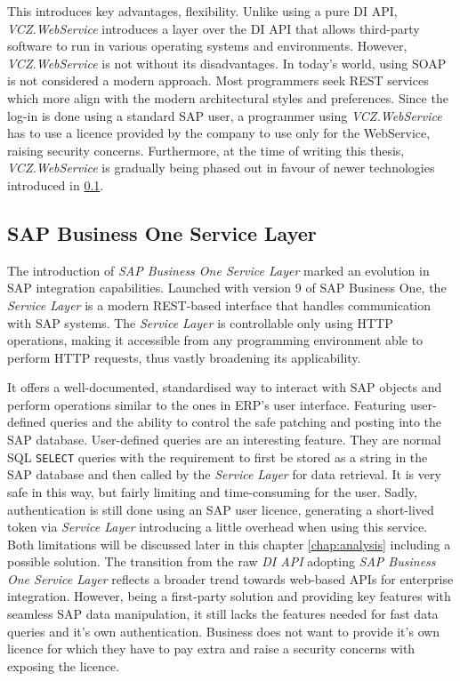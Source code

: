 This introduces key advantages, flexibility. 
Unlike using a pure \ac{DI API}, \textit{VCZ.WebService} introduces a layer over the \ac{DI API} that allows third-party software to run in various operating systems and environments.
However, \textit{VCZ.WebService} is not without its disadvantages.
In today's world, using \ac{SOAP} is not considered a modern approach. Most programmers seek \ac{REST} services which more align with the modern architectural styles and preferences.
Since the log-in is done using a standard SAP user, a programmer using \textit{VCZ.WebService} has to use a licence provided by the company to use only for the WebService, raising security concerns.
Furthermore, at the time of writing this thesis, \textit{VCZ.WebService} is gradually being phased out in favour of newer technologies introduced in \ref{subsec:sap-b1-service-layer}.

\subsection{SAP Business One Service Layer}
\label{subsec:sap-b1-service-layer}

The introduction of \textit{ SAP Business One Service Layer} marked an evolution in SAP integration capabilities. 
Launched with version 9 of SAP Business One, the \textit{Service Layer} is a modern \ac{REST}-based interface that handles communication with SAP systems. 
The \textit{Service Layer} is controllable only using HTTP operations, making it accessible from any programming environment able to perform HTTP requests, thus vastly broadening its applicability.

It offers a well-documented, standardised way to interact with SAP objects and perform operations similar to the ones in \ac{ERP}'s user interface. 
Featuring user-defined queries and the ability to control the safe patching and posting into the SAP database.
User-defined queries are an interesting feature. They are normal SQL \texttt{SELECT} queries with the requirement to first be stored as a string in the SAP database and then called by the \textit{ Service Layer} for data retrieval.
It is very safe in this way, but fairly limiting and time-consuming for the user. 
Sadly, authentication is still done using an SAP user licence, generating a short-lived token via \textit{Service Layer} introducing a little overhead when using this service.
Both limitations will be discussed later in this chapter \ref{chap:analysis} including a possible solution.
The transition from the raw \textit{DI API} adopting \textit{SAP Business One Service Layer} reflects a broader trend towards web-based APIs for enterprise integration.
However, being a first-party solution and providing key features with seamless SAP data manipulation, it still lacks the features needed for fast data queries and it's own authentication. Business does not want to provide it's own licence for which they have to pay extra and raise a security concerns with exposing the licence.

